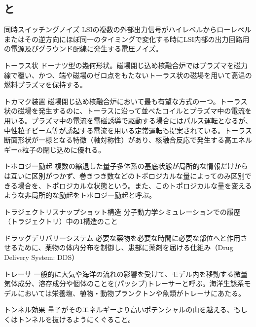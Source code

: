 \begin{用語集}
\section{と}
\item{同時スイッチングノイズ}{}
{LSIの複数の外部出力信号がハイレベルからローレベルまたはその逆方向にほぼ同一のタイミングで変化する時にLSI内部の出力回路用の電源及びグラウンド配線に発生する電圧ノイズ。}
\item{トーラス状}{}
{ドーナツ型の幾何形状。磁場閉じ込め核融合炉ではプラズマを磁力線で覆い、かつ、端や磁場のゼロ点をもたないトーラス状の磁場を用いて高温の燃料プラズマを保持する。}
\item{トカマク装置}{}
{磁場閉じ込め核融合炉において最も有望な方式の一つ。トーラス状の磁場を発生するのに、トーラスに沿って並べたコイルとプラズマ中の電流を用いる。プラズマ中の電流を電磁誘導で駆動する場合にはパルス運転となるが、中性粒子ビーム等が誘起する電流を用いる定常運転も提案されている。トーラス断面形状が一様となる特徴（軸対称性）があり、核融合反応で発生する高エネルギー$\alpha$粒子の閉じ込めに優れる。}
\item{トポロジー励起}{}
{複数の縮退した量子多体系の基底状態が局所的な情報だけからは互いに区別がつかず、巻きつき数などのトポロジカルな量によってのみ区別できる場合を、トポロジカルな状態という。また、このトポロジカルな量を変えるような非局所的な励起をトポロジー励起と呼ぶ。}
\item{トラジェクトリスナップショット構造}{}
{分子動力学シミュレーションでの履歴（トラジェクトリ）中の1構造のこと}
\item{ドラッグデリバリーシステム}{}
{必要な薬物を必要な時間に必要な部位へと作用させるために、薬物の体内分布を制御し、患部に薬剤を届ける仕組み（Drug Delivery System: DDS）}
\item{トレーサ}{}
{一般的に大気や海洋の流れの影響を受けて、モデル内を移動する微量気体成分、溶存成分や個体のことを(パッシブ)トレーサーと呼ぶ。海洋生態系モデルにおいては栄養塩、植物・動物プランクトンや魚類がトレーサにあたる。}
\item{トンネル効果}{}
{量子がそのエネルギーより高いポテンシャルの山を越える、もしくはトンネルを抜けるようにくぐること。}

\end{用語集}
